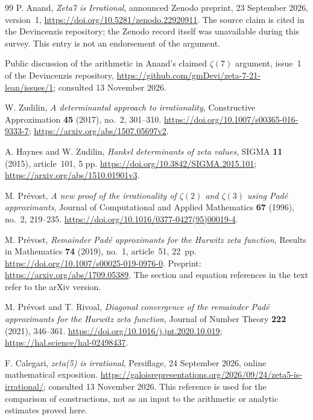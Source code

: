 \documentclass[11pt,letterpaper]{article}
\theoremstyle{definition}
\begin{document}
\begin{thebibliography}{99}
P. Anand, \emph{Zeta7 is Irrational}, announced Zenodo preprint,
23 September 2026, version~1,
\url{https://doi.org/10.5281/zenodo.22920911}.
The source claim is cited in the Devincenzis repository; the Zenodo
record itself was unavailable during this survey.  This entry is not
an endorsement of the argument.

Public discussion of the arithmetic in Anand's claimed $\zeta(7)$
argument, issue~1 of the Devincenzis repository,
\url{https://github.com/gmDevi/zeta-7-21-lean/issues/1}; consulted
13 November 2026.

W. Zudilin, \emph{A determinantal approach to irrationality},
Constructive Approximation \textbf{45} (2017), no.~2, 301--310.
\url{https://doi.org/10.1007/s00365-016-9333-7};
\url{https://arxiv.org/abs/1507.05697v2}.

A. Haynes and W. Zudilin, \emph{Hankel determinants of zeta values},
SIGMA \textbf{11} (2015), article~101, 5 pp.
\url{https://doi.org/10.3842/SIGMA.2015.101};
\url{https://arxiv.org/abs/1510.01901v3}.

M. Pr\'evost, \emph{A new proof of the irrationality of $\zeta(2)$ and
$\zeta(3)$ using Pad\'e approximants}, Journal of Computational and Applied
Mathematics \textbf{67} (1996), no.~2, 219--235.
\url{https://doi.org/10.1016/0377-0427(95)00019-4}.

M. Pr\'evost, \emph{Remainder Pad\'e approximants for the Hurwitz zeta
function}, Results in Mathematics \textbf{74} (2019), no.~1, article~51,
22~pp. \url{https://doi.org/10.1007/s00025-019-0976-0}.
Preprint: \url{https://arxiv.org/abs/1709.05389}.
The section and equation references in the text refer to the arXiv version.

M. Pr\'evost and T. Rivoal, \emph{Diagonal convergence of the remainder
Pad\'e approximants for the Hurwitz zeta function}, Journal of Number
Theory \textbf{222} (2021), 346--361.
\url{https://doi.org/10.1016/j.jnt.2020.10.019};
\url{https://hal.science/hal-02498437}.

F. Calegari, \emph{zeta(5) is irrational}, Persiflage,
24 September 2026, online mathematical exposition.
\url{https://galoisrepresentations.org/2026/09/24/zeta5-is-irrational/};
consulted 13 November 2026.
This reference is used for the comparison of constructions, not as an
input to the arithmetic or analytic estimates proved here.

\end{thebibliography}
\endgroup
\end{document}
